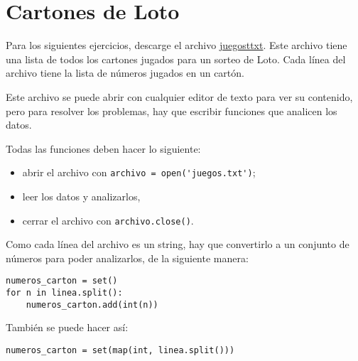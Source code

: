 \section{Cartones de Loto}

Para los siguientes ejercicios, descarge el archivo
\href{../../\_static/juegos.txt}{juegosttxt}. Este archivo tiene una
lista de todos los cartones jugados para un sorteo de Loto. Cada línea
del archivo tiene la lista de números jugados en un cartón.

Este archivo se puede abrir con cualquier editor de texto para ver su
contenido, pero para resolver los problemas, hay que escribir funciones
que analicen los datos.

Todas las funciones deben hacer lo siguiente:

\begin{itemize}
\item
  abrir el archivo con \lstinline!archivo = open('juegos.txt')!;
\item
  leer los datos y analizarlos,
\item
  cerrar el archivo con \lstinline!archivo.close()!.
\end{itemize}

Como cada línea del archivo es un string, hay que convertirlo a un
conjunto de números para poder analizarlos, de la siguiente manera:

\begin{lstlisting}
numeros_carton = set()
for n in linea.split():
    numeros_carton.add(int(n))
\end{lstlisting}

También se puede hacer así:

\begin{lstlisting}
numeros_carton = set(map(int, linea.split()))
\end{lstlisting}

